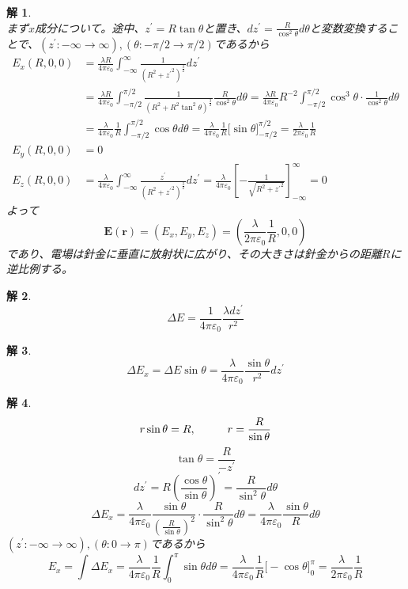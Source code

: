 \documentclass{jsarticle}
\newtheorem{ans}{解}[section]
\begin{document}
\begin{ans}~\\
まず\(x\)成分について。途中、\(z^{\prime}=R\tan\theta\)と置き、\(dz^{\prime}=\frac{R}{\cos^{2}\theta}d\theta\)と変数変換することで、\((z^{\prime}:-\infty\to\infty),(\theta:-\pi/2\to\pi/2)\)であるから
\begin{align*}
E_{x}(R,0,0)&=\frac{\lambda R}{4\pi\varepsilon_{0}}\int_{-\infty}^{\infty}\frac{1}{\left(R^{2}+{z^{\prime}}^{2}\right)^{\frac{3}{2}}}dz^{\prime}\\
&=\frac{\lambda R}{4\pi\varepsilon_{0}}\int_{-\pi/2}^{\pi/2}\frac{1}{\left(R^{2}+R^{2}\tan^{2}\theta\right)^{\frac{3}{2}}}\frac{R}{\cos^{2}\theta}d\theta=\frac{\lambda R}{4\pi\varepsilon_{0}}R^{-2}\int_{-\pi/2}^{\pi/2}\cos^{3}\theta\cdot\frac{1}{\cos^{2}\theta}d\theta\\
&=\frac{\lambda}{4\pi\varepsilon_{0}}\frac{1}{R}\int_{-\pi/2}^{\pi/2}\cos\theta d\theta=\frac{\lambda}{4\pi\varepsilon_{0}}\frac{1}{R}\Big[\sin\theta\Big]_{-\pi/2}^{\pi/2}=\frac{\lambda}{2\pi\varepsilon_{0}}\frac{1}{R}\\
E_{y}(R,0,0)&=0\\
E_{z}(R,0,0)&=\frac{\lambda}{4\pi\varepsilon_{0}}\int_{-\infty}^{\infty}\frac{z^{\prime}}{\left(R^{2}+{z^{\prime}}^{2}\right)^{\frac{3}{2}}}dz^{\prime}=\frac{\lambda}{4\pi\varepsilon_{0}}\left[-\frac{1}{\sqrt{R^{2}+{z^{\prime}}^{2}}}\right]_{-\infty}^{\infty}=0
\end{align*}
よって
\[\bm{E}(\bm{r})=(E_{x},E_{y},E_{z})=\left(\frac{\lambda}{2\pi\varepsilon_{0}}\frac{1}{R},0,0\right)\]
であり、電場は針金に垂直に放射状に広がり、その大きさは針金からの距離\(R\)に逆比例する。
\end{ans}

\begin{ans}~\\
\[\Delta E=\frac{1}{4\pi\varepsilon_{0}}\frac{\lambda dz^{\prime}}{r^{2}}\]
\end{ans}

\begin{ans}~\\
\[\Delta E_{x}=\Delta E\sin\theta=\frac{\lambda}{4\pi\varepsilon_{0}}\frac{\sin\theta}{r^{2}}dz^{\prime}\]
\end{ans}

\begin{ans}~\\
\[r\sin\theta=R,\hspace{10mm}r=\frac{R}{\sin\theta}\]
\[\tan\theta=\frac{R}{-z^{\prime}}\]
\[dz^{\prime}=R\left(\frac{\cos\theta}{\sin\theta}\right)^{\prime}=\frac{R}{\sin^{2}\theta}d\theta\]
\[\Delta E_{x}=\frac{\lambda}{4\pi\varepsilon_{0}}\frac{\sin\theta}{\left(\frac{R}{\sin\theta}\right)^{2}}\cdot\frac{R}{\sin^{2}\theta}d\theta=\frac{\lambda}{4\pi\varepsilon_{0}}\frac{\sin\theta}{R}d\theta\]
\((z^{\prime}:-\infty\to\infty),(\theta:0\to\pi)\)であるから
\[E_{x}=\int\Delta E_{x}=\frac{\lambda}{4\pi\varepsilon_{0}}\frac{1}{R}\int_{0}^{\pi}\sin\theta d\theta=\frac{\lambda}{4\pi\varepsilon_{0}}\frac{1}{R}\Big[-\cos\theta\Big]_{0}^{\pi}=\frac{\lambda}{2\pi\varepsilon_{0}}\frac{1}{R}\]
\end{ans}
\end{document}
